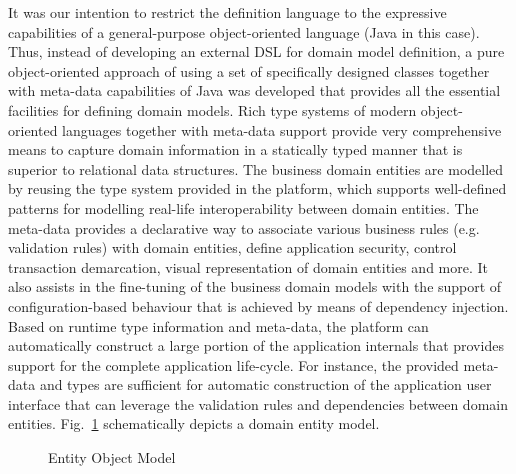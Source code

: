   It was our intention to restrict the definition language to the expressive capabilities of a general-purpose object-oriented language (Java in this case).
  Thus, instead of developing an external DSL for domain model definition, a pure object-oriented approach of using a set of specifically designed classes together with meta-data capabilities of Java was developed that provides all the essential facilities for defining domain models.
  Rich type systems of modern object-oriented languages together with meta-data support provide very comprehensive means to capture domain information in a statically typed manner that is superior to relational data structures.  
  The business domain entities are modelled by reusing the type system provided in the platform, which supports well-defined patterns for modelling real-life interoperability between domain entities.  
  The meta-data provides a declarative way to associate various business rules (e.g. validation rules) with domain entities, define application security, control transaction demarcation, visual representation of domain entities and more.
  It also assists in the fine-tuning of the business domain models with the support of configuration-based behaviour that is achieved by means of dependency injection.  
  Based on runtime type information and meta-data, the platform can automatically construct a large portion of the application internals that provides support for the complete application life-cycle.
  For instance, the provided meta-data and types are sufficient for automatic construction of the application user interface that can leverage the validation rules and dependencies between domain entities.  
  Fig.~\ref{img:ch02:02:entity-object-model} schematically depicts a domain entity model.
  

\begin{figure}[!htp]    
    \centering   
    \caption{Entity Object Model}\label{img:ch02:02:entity-object-model}
  \end{figure}

